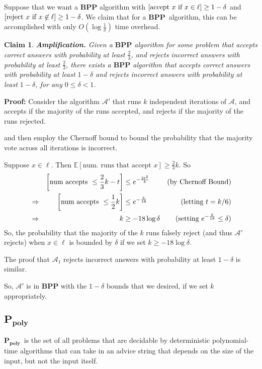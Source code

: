 \documentclass[11pt]{article}
\let\Pr\relax
\DeclareMathOperator*{\Pr}{\mathbb{P}}
\newcommand{\BPP}{\ensuremath{\mathbf{BPP}}}
\newcommand{\Ppoly}{\ensuremath{\mathbf{P_{poly}}}}
\newcommand{\Alg}{\ensuremath{\mathcal{A}}}
\newtheorem{claim}[theorem]{Claim}
\begin{document}
Suppose that we want a $\BPP$ algorithm with $\Pr[\text{accept $x$ if $x\in\ell$}] \ge 1-\delta$ and $\Pr[\text{reject $x$ if $x\not\in\ell$}] \ge 1 - \delta$. We claim that for a \BPP\ algorithm, this can be accomplished with only $O(\log{\frac{1}{\delta}})$ time overhead.

\begin{claim}
\textbf{Amplification.} Given a $\BPP$ algorithm for some problem that accepts correct answers with probability at least $\frac23$, and rejects incorrect answers with probability at least $\frac23$, there exists a $\BPP$ algorithm that accepts correct answers with probability at least $1 - \delta$ and rejects incorrect answers with probability at least $1 - \delta$, for any $0 \le \delta < 1$.

\end{claim}
\textbf{Proof:} Consider the algorithm $\Alg'$ that runs $k$ independent iterations of $\Alg$, and accepts if the majority of the runs accepted, and rejects if the majority of the runs rejected.

and then employ the Chernoff bound to bound the probability that the majority vote across all iterations is incorrect.

Suppose $x\in\ell$. Then $\mathbb{E}[\text{num. runs that accept } x] \geq \frac{2}{3}k$.
So
\begin{align*}
  &&\Pr\left[\text{num accepts }\leq \frac{2}{3}k - t\right] &\leq e^{-{\frac{2t^2}{k}}} &\text{(by Chernoff Bound)} \\
  &\Rightarrow&
  \Pr\left[\text{num accepts }\leq \frac12k\right] &\leq e^{-{\frac{k}{18}}} &\text{(letting $t = k/6$)} \\
  &\Rightarrow &
  k &\ge -18\log \delta &\text{(setting $e^{-\frac{k}{18}} \le \delta$)}
\end{align*}
So, the probability that the majority of the $k$ runs falsely reject (and thus $\Alg'$ rejects) when $x \in \ell$ is bounded by $\delta$ if we set $k \ge -18 \log \delta$.

The proof that $\Alg_1$ rejects incorrect answers with probability at least $1 - \delta$ is similar.

So, $\Alg'$ is in $\BPP$ with the $1 - \delta$ bounds that we desired, if we set $k$ appropriately.

\subsection{\Ppoly}

\Ppoly\ is the set of all problems that are decidable by deterministic polynomial-time algorithms that can take in an advice string that depends on the size of the input, but not the input itself.
\end{document}
